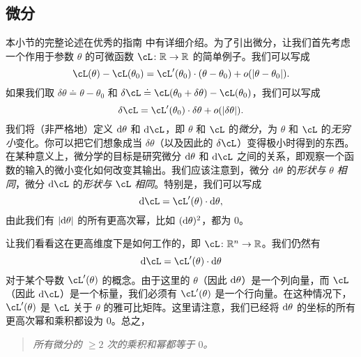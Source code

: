 \documentclass[../../book-main_zh.tex]{subfiles}
\begin{document}
\subsection{微分}

本小节的完整论述在优秀的指南 \cite{bright2025matrix} 中有详细介绍。为了引出微分，让我们首先考虑一个作用于参数 \(\theta\) 的可微函数 \(\cL \colon \R \to \R\) 的简单例子。我们可以写成
\begin{equation}
    \cL(\theta) - \cL(\theta_{0}) = \cL^{\prime}(\theta_{0})\cdot(\theta - \theta_{0}) + o(\abs{\theta - \theta_{0}}).
\end{equation}
如果我们取 \(\delta\theta \doteq \theta - \theta_{0}\) 和 \(\delta\cL \doteq \cL(\theta_{0} + \delta\theta) - \cL(\theta_{0})\)，我们可以写成
\begin{equation}
    \delta\cL = \cL^{\prime}(\theta_{0})\cdot\delta\theta + o(\abs{\delta\theta}).
\end{equation}
我们将（非严格地）定义 \(\mathrm{d}\theta\) 和 \(\odif{\cL}\)，即 \(\theta\) 和 \(\cL\) 的\textit{微分}，为 \(\theta\) 和 \(\cL\) 的\textit{无穷小}变化。你可以把它们想象成当 \(\delta\theta\)（以及因此的 \(\delta \cL\)）变得极小时得到的东西。在某种意义上，微分学的目标是研究微分 \(\mathrm{d}\theta\) 和 \(\odif{\cL}\) 之间的关系，即观察一个函数的输入的微小变化如何改变其输出。我们应该注意到，微分 \(\mathrm{d}\theta\) 的\textit{形状与} \(\theta\) \textit{相同}，微分 \(\odif{\cL}\) 的\textit{形状与} \(\cL\) \textit{相同}。特别是，我们可以写成
\begin{equation}
    \odif{\cL} = \cL^{\prime}(\theta)\cdot\odif{\theta},
\end{equation}
由此我们有 \(\abs{\odif{\theta}}\) 的所有更高次幂，比如 \((\mathrm{d}\theta)^{2}\)，都为 \(0\)。

让我们看看这在更高维度下是如何工作的，即 \(\cL \colon \R^{n} \to \R\)。我们仍然有
\begin{equation}
    \odif{\cL} = \cL^{\prime}(\theta)\cdot\odif{\theta}
\end{equation}
对于某个导数 \(\cL^{\prime}(\theta)\) 的概念。由于这里的 \(\theta\)（因此 \(\mathrm{d}\theta\)）是一个列向量，而 \(\cL\)（因此 \(\odif{\cL}\)）是一个标量，我们必须有 \(\cL^{\prime}(\theta)\) 是一个行向量。在这种情况下，\(\cL^{\prime}(\theta)\) 是 \(\cL\) 关于 \(\theta\) 的雅可比矩阵。这里请注意，我们已经将 \(\mathrm{d}\theta\) 的坐标的所有更高次幂和乘积都设为 \(0\)。总之，
\begin{quote}
    \centering
    \textit{所有微分的 \(\geq 2\) 次的乘积和幂都等于 \(0\)。}
\end{quote}
\end{document}
